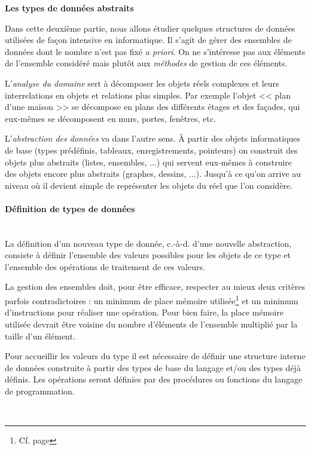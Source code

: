 \centerline{\large\bf Les types de donn\'ees abstraits}
 
\noindent\hrulefill  
\begin{multicols}{2}

\hspace*{3cm}


Dans cette deuxi\`eme partie, nous allons \'etudier quelques structures de donn\'ees
utilis\'ees de fa\c con intensive en informatique. Il s'agit de g\'erer des
ensembles de donn\'ees dont le nombre n'est pas fix\'e {\em a priori}. On ne
s'int\'eresse pas aux \'el\'ements de l'ensemble consid\'er\'e  mais plut\^ot aux
{\em m\'ethodes} de gestion de ces \'el\'ements. 

L'{\em analyse du domaine} sert \`a d\'ecomposer les objets r\'eels complexes et leurs
interrelations en objets et relations plus simples. Par exemple
l'objet << plan d'une maison >> se d\'ecompose en plans des diff\'erents
\'etages et des
fa\c cades, qui eux-m\^emes se d\'ecomposent en murs, portes, fen\^etres, etc.

L'{\em abstraction des donn\'ees} va dans l'autre sens. \`A partir des objets
informatiques de base (types pr\'ed\'efinis, tableaux, enregistrements,
pointeurs) on construit des objets plus abstraits (listes, ensembles, ...) qui
servent eux-m\^emes \`a construire des objets encore plus abstraits (graphes,
dessins, ...). Jusqu'\`a ce qu'on arrive au niveau o\`u il devient simple de
repr\'esenter les objets du r\'eel que l'on consid\`ere. 

\paragraph{D\'efinition de types de donn\'ees}
~\\
La d\'efinition d'un nouveau type de donn\'ee, c.-\`a-d. d'une nouvelle abstraction,
consiste \`a d\'efinir l'ensemble des valeurs possibles pour les objets de
ce type et l'ensemble des op\'erations de traitement de ces valeurs.

La gestion des ensembles doit, pour \^etre efficace, respecter au mieux 
deux crit\`eres parfois contradictoires : un minimum de place m\'emoire
utilis\'ee\footnote{Cf. page \pageref{Complexite}}
 et un minimum d'instructions pour r\'ealiser une
op\'eration. Pour bien faire, la place m\'emoire utilis\'ee devrait \^etre voisine du
nombre d'\'el\'ements de l'ensemble multipli\'e par la taille d'un \'el\'ement.

Pour accueillir les valeurs du type il est n\'ecessaire de d\'efinir une structure
interne de donn\'ees construite \`a partir des types de base du langage et/ou
des types d\'ej\`a d\'efinis. Les op\'erations seront d\'efinies par des proc\'edures ou
fonctions du langage de programmation.

\newpage

 ~ 


\end{multicols}
